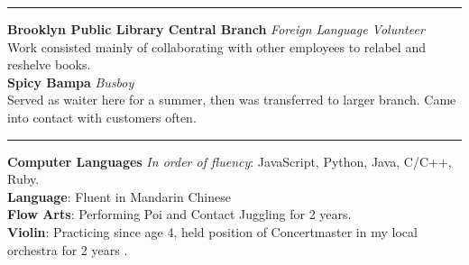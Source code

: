 \documentclass[14, .75in]{article}
\begin{document}
  \vspace{0.1cm} \hrule \vspace{0.3cm}
  \noindent\textbf{Brooklyn Public Library Central Branch}\textit{ Foreign Language Volunteer}\\
  Work consisted mainly of collaborating with other employees to relabel and reshelve books.\\
  \textbf{Spicy Bampa}\textit{ Busboy}\\
  Served as waiter here for a summer, then was transferred to larger branch. Came into contact with customers often.



  \vspace{0.1cm} \hrule \vspace{0.3cm}
  \noindent\textbf{Computer Languages}\textit{ In order of fluency}:
  JavaScript, Python, Java, C/C++, Ruby.\\
  \noindent\textbf{Language}: Fluent in Mandarin Chinese\\
  \textbf{Flow Arts}: Performing Poi and Contact Juggling for 2 years.\\
  \textbf{Violin}: Practicing since age 4, held position of Concertmaster in my local orchestra for 2 years .
\end{document}
